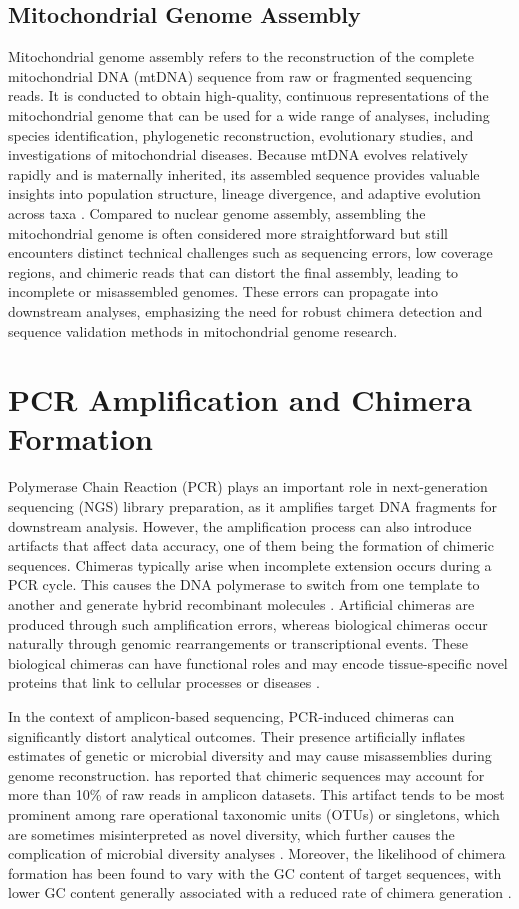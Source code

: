 \subsection {Mitochondrial Genome Assembly}
Mitochondrial genome assembly refers to the reconstruction of the complete mitochondrial DNA (mtDNA) sequence from raw or fragmented sequencing reads. It is conducted to obtain high-quality, continuous representations of the mitochondrial genome that can be used for a wide range of analyses, including species identification, phylogenetic reconstruction, evolutionary studies, and investigations of mitochondrial diseases. Because mtDNA evolves relatively rapidly and is maternally inherited, its assembled sequence provides valuable insights into population structure, lineage divergence, and adaptive evolution across taxa \citep{Boore1999}. Compared to nuclear genome assembly, assembling the mitochondrial genome is often considered more straightforward but still encounters distinct technical challenges such as sequencing errors, low coverage regions, and chimeric reads that can distort the final assembly, leading to incomplete or misassembled genomes. These errors can propagate into downstream analyses, emphasizing the need for robust chimera detection and sequence validation methods in mitochondrial genome research.

\section{PCR Amplification and Chimera Formation}
Polymerase Chain Reaction (PCR) plays an important role in next-generation sequencing (NGS) library preparation, as it amplifies target DNA fragments for downstream analysis. However, the amplification process can also introduce artifacts that affect data accuracy, one of them being the formation of chimeric sequences. Chimeras typically arise when incomplete extension occurs during a PCR cycle. This causes the DNA polymerase to switch from one template to another and generate hybrid recombinant molecules \citep{Judo1998}. Artificial chimeras are produced through such amplification errors, whereas biological chimeras occur naturally through genomic rearrangements or transcriptional events. These biological chimeras can have functional roles and may encode tissue-specific novel proteins that link to cellular processes or diseases  \citep{Frenkel2012}.

In the context of amplicon-based sequencing, PCR-induced chimeras can significantly distort analytical outcomes. Their presence artificially inflates estimates of genetic or microbial diversity and may cause misassemblies during genome reconstruction. \citep{Qin2023} has reported that chimeric sequences may account for more than 10\% of raw reads in amplicon datasets. This artifact tends to be most prominent among rare operational taxonomic units (OTUs) or singletons, which are sometimes misinterpreted as novel diversity, which further causes the complication of microbial diversity analyses \citep{Gonzalez2004}. Moreover, the likelihood of chimera formation has been found to vary with the GC content of target sequences, with lower GC content generally associated with a reduced rate of chimera generation \citep{Qin2023}.

